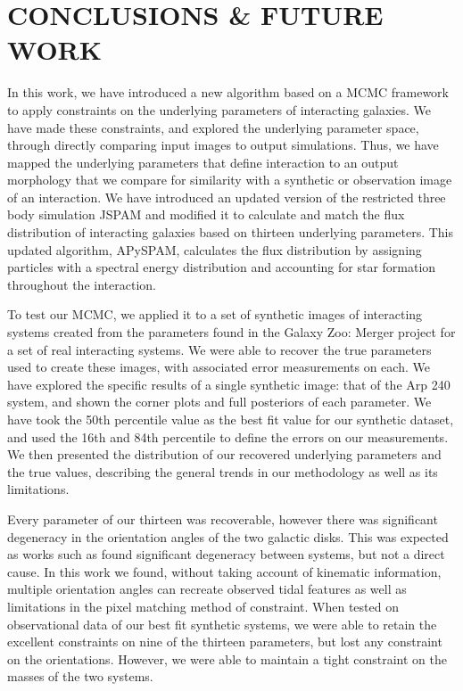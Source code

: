 \section{CONCLUSIONS \& FUTURE WORK}\label{Conclusions}
\noindent In this work, we have introduced a new algorithm based on a MCMC framework to apply constraints on the underlying parameters of interacting galaxies. We have made these constraints, and explored the underlying parameter space, through directly comparing input images to output simulations. Thus, we have mapped the underlying parameters that define interaction to an output morphology that we compare for similarity with a synthetic or observation image of an interaction. We have introduced an updated version of the restricted three body simulation JSPAM and modified it to calculate and match the flux distribution of interacting galaxies based on thirteen underlying parameters. This updated algorithm, APySPAM, calculates the flux distribution by assigning particles with a spectral energy distribution and accounting for star formation throughout the interaction. 

To test our MCMC, we applied it to a set of synthetic images of interacting systems created from the parameters found in the Galaxy Zoo: Merger project for a set of real interacting systems. We were able to recover the true parameters used to create these images, with associated error measurements on each. We have explored the specific results of a single synthetic image: that of the Arp 240 system, and shown the corner plots and full posteriors of each parameter. We have took the 50th percentile value as the best fit value for our synthetic dataset, and used the 16th and 84th percentile to define the errors on our measurements. We then presented the distribution of our recovered underlying parameters and the true values, describing the general trends in our methodology as well as its limitations. 

Every parameter of our thirteen was recoverable, however there was significant degeneracy in the orientation angles of the two galactic disks. This was expected as works such as \citet{2010ASPC..423..227S} found significant degeneracy between systems, but not a direct cause. In this work we found, without taking account of kinematic information, multiple orientation angles can recreate observed tidal features as well as limitations in the pixel matching method of constraint. When tested on observational data of our best fit synthetic systems, we were able to retain the excellent constraints on nine of the thirteen parameters, but lost any constraint on the orientations. However, we were able to maintain a tight constraint on the masses of the two systems. 

